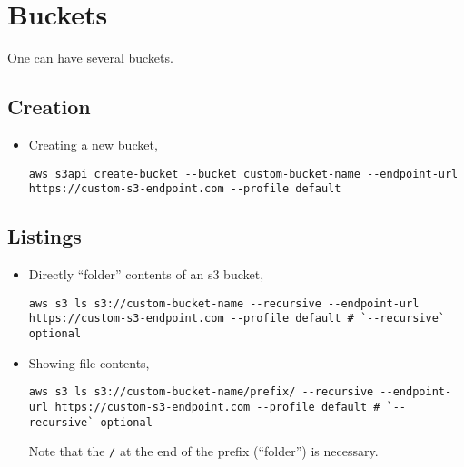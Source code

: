 \documentclass[12pt, a4paper]{scrbook}
\numberwithin{equation}{section}
\theoremstyle{definition}
\theoremstyle{definition}
\begin{document}
	\section{Buckets}
	
	One can have several buckets. 
	
	\subsection{Creation}
	
	\begin{itemize}
		
		\item Creating a new bucket,
		
		\begin{lstlisting}[style=mystylebash, label=alg:aws__new_bucket, xleftmargin=\parindent]
			aws s3api create-bucket --bucket custom-bucket-name --endpoint-url https://custom-s3-endpoint.com --profile default
		\end{lstlisting}
		
	\end{itemize} 
	
	\subsection{Listings}
	
	\begin{itemize} 
		
		\item Directly \enquote{folder} contents of an s3 bucket,
		
		\begin{lstlisting}[style=mystylebash, label=alg:aws__bucket_ls, xleftmargin=\parindent]
			aws s3 ls s3://custom-bucket-name --recursive --endpoint-url https://custom-s3-endpoint.com --profile default # `--recursive` optional
		\end{lstlisting}
		
		\item Showing file contents,
		
		\begin{lstlisting}[style=mystylebash, label=alg:aws__bucket_prefix_ls, xleftmargin=\parindent]
			aws s3 ls s3://custom-bucket-name/prefix/ --recursive --endpoint-url https://custom-s3-endpoint.com --profile default # `--recursive` optional
		\end{lstlisting}
		
		Note that the \texttt{/} at the end of the prefix (\enquote{folder}) is necessary.
		
	\end{itemize}
	
\end{document}
